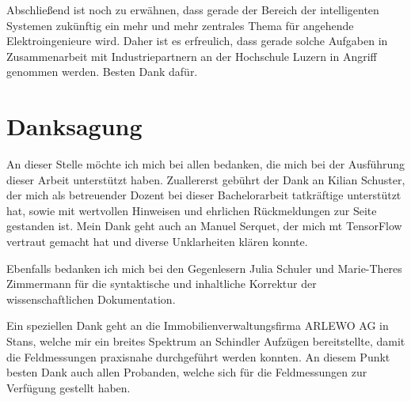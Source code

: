 Abschließend ist noch zu erwähnen, dass gerade der Bereich der intelligenten Systemen zukünftig ein mehr und mehr zentrales Thema für angehende Elektroingenieure wird. Daher ist es erfreulich, dass gerade solche Aufgaben in Zusammenarbeit mit Industriepartnern an der Hochschule Luzern in Angriff genommen werden. Besten Dank dafür.



  



\section{Danksagung}

An dieser Stelle möchte ich mich bei allen bedanken, die mich bei der Ausführung dieser Arbeit unterstützt haben. 
Zuallererst gebührt der Dank an Kilian Schuster, der mich als betreuender Dozent bei dieser Bachelorarbeit tatkräftige unterstützt hat, sowie mit wertvollen Hinweisen und ehrlichen Rückmeldungen zur Seite gestanden ist. Mein Dank geht auch an Manuel Serquet, der mich mt TensorFlow vertraut gemacht hat und diverse Unklarheiten klären konnte. 

Ebenfalls bedanken ich mich bei den Gegenlesern Julia Schuler und Marie-Theres Zimmermann für die syntaktische und inhaltliche Korrektur der wissenschaftlichen Dokumentation.

Ein speziellen Dank geht an die Immobilienverwaltungsfirma ARLEWO AG in Stans, welche mir ein breites Spektrum an Schindler Aufzügen bereitstellte, damit die Feldmessungen praxisnahe durchgeführt werden konnten. An diesem Punkt besten Dank auch allen Probanden, welche sich für die Feldmessungen zur Verfügung gestellt haben.